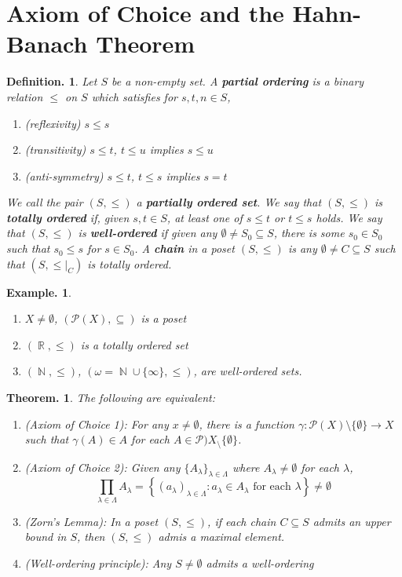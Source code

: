\documentclass[11pt, a4paper]{memoir}
\DeclareMathOperator{\N}{{\mathbb{N}}}
\DeclareMathOperator{\R}{{\mathbb{R}}}
\theoremstyle{change}
\newtheorem{theorem}{Theorem.}[section]
\theoremstyle{plain}
\theoremstyle{nonumberplain}
\newtheorem{definition}{Definition.}
\newtheorem{example}{Example.}
\numberwithin{equation}{section}
\begin{document}
\section{Axiom of Choice and the Hahn-Banach Theorem}
\begin{definition}
    Let $S$ be a non-empty set.
    A \textbf{partial ordering} is a binary relation $\leq$ on $S$ which satisfies for $s,t,n\in S$,
    \begin{enumerate}[nl,r]
        \item \textit{(reflexivity)} $s\leq s$
        \item \textit{(transitivity)} $s\leq t$, $t\leq u$ implies $s\leq u$
        \item \textit{(anti-symmetry)} $s\leq t$, $t\leq s$ implies $s=t$
    \end{enumerate}
    We call the pair $(S,\leq)$ a \textbf{partially ordered set}.
    We say that $(S,\leq)$ is \textbf{totally ordered} if, given $s,t\in S$, at least one of $s\leq t$ or $t\leq s$ holds.
    We say that $(S,\leq)$ is \textbf{well-ordered} if given any $\emptyset\neq S_0\subseteq S$, there is some $s_0\in S_0$ such that $s_0\leq s$ for $s\in S_0$.
    A \textbf{chain} in a poset $(S,\leq)$ is any $\emptyset\neq C\subseteq S$ such that $(S,\leq|_C)$ is totally ordered.
\end{definition}
\begin{example}
    \begin{enumerate}[nl,r]
        \item $X\neq\emptyset$, $(\mathcal{P}(X),\subseteq)$ is a poset
        \item $(\R,\leq)$ is a totally ordered set
        \item $(\N,\leq)$, $(\omega=\N\cup\{\infty\},\leq)$, are well-ordered sets.
    \end{enumerate}
\end{example}
\begin{theorem}
    The following are equivalent:
    \begin{enumerate}[nl,r]
        \item \textit{(Axiom of Choice 1)}: For any $x\neq\emptyset$, there is a function $\gamma:\mathcal{P}(X)\setminus\{\emptyset\}\to X$ such that $\gamma(A)\in A$ for each $A\in\mathcal{P})X_\setminus\{\emptyset\}$.
        \item \textit{(Axiom of Choice 2)}: Given any $\{A_\lambda\}_{\lambda\in\Lambda}$ where $A_\lambda\neq\emptyset$ for each $\lambda$,
            \begin{equation*}
                \prod_{\lambda\in\Lambda}A_\lambda = \left\{(a_\lambda)_{\lambda\in\Lambda}:a_\lambda\in A_\lambda\text{ for each }\lambda\right\}\neq \emptyset
            \end{equation*}
        \item \textit{(Zorn's Lemma)}: In a poset $(S,\leq)$, if each chain $C\subseteq S$ admits an upper bound in $S$, then $(S,\leq)$ admis a maximal element.
        \item \textit{(Well-ordering principle)}: Any $S\neq\emptyset$ admits a well-ordering
    \end{enumerate}
\end{theorem}
\end{document}
